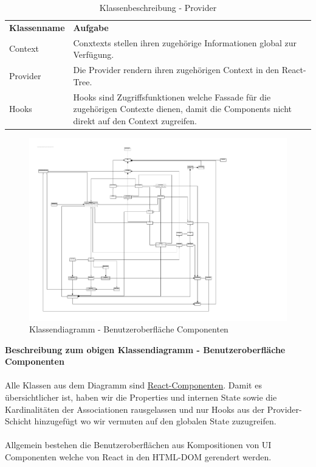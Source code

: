 \begin{table}[H]
	\centering
	\begin{tabularx}{\textwidth}{X X}
		\rowcolor[HTML]{C0C0C0} 
		\textbf{Klassenname} & \textbf{Aufgabe} \\
		Context & Conxtexts stellen ihren zugehörige Informationen global zur Verfügung.  \\
		\rowcolor[HTML]{E7E7E7} 
		Provider & Die Provider rendern ihren zugehörigen Context in den React-Tree. \\
		Hooks & Hooks sind Zugriffsfunktionen welche Fassade für die zugehörigen Contexte dienen, damit die Components nicht direkt auf den Context zugreifen. \\
	\end{tabularx}
	\caption{Klassenbeschreibung - Provider}
	\label{table:klassenbeschreibung-provider}
\end{table}
\newpage

\begin{figure}[H]
	\hspace{-3cm}
	\includegraphics[scale = 0.9]{./img/diagrams/web-class}
	\caption{Klassendiagramm - Benutzeroberfläche Componenten}
\end{figure}
\newpage

\textbf{Beschreibung zum obigen Klassendiagramm - Benutzeroberfläche Componenten} \\ \\
Alle Klassen aus dem Diagramm sind \href{https://reactjs.org/docs/components-and-props.html}{React-Componenten}. Damit es übersichtlicher ist, haben wir die Properties und internen State sowie die Kardinalitäten der Associationen rausgelassen und nur Hooks aus der Provider-Schicht hinzugefügt wo wir vermuten auf den globalen State zuzugreifen. \\ \\
Allgemein bestehen die Benutzeroberflächen aus Kompositionen von UI Componenten welche von React in den HTML-DOM gerendert werden. 
 
